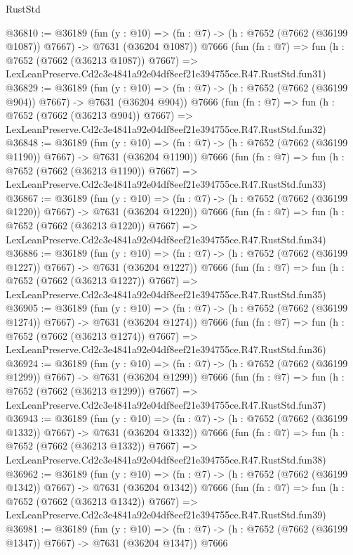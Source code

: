 \begin{lexlean}{RustStd}
\begin{coremodule}
@36810 := @36189
    (fun (y : @10) => (fn : @7) -> (h : @7652 (@7662 (@36199 @1087)) @7667) -> @7631 (@36204 @1087))
    @7666
    (fun (fn : @7) =>
    fun (h : @7652 (@7662 (@36213 @1087)) @7667) =>
    LexLeanPreserve.Cd2c3e4841a92e04df8eef21e394755ce.R47.RustStd.fun31)
@36829 := @36189
    (fun (y : @10) => (fn : @7) -> (h : @7652 (@7662 (@36199 @904)) @7667) -> @7631 (@36204 @904))
    @7666
    (fun (fn : @7) =>
    fun (h : @7652 (@7662 (@36213 @904)) @7667) =>
    LexLeanPreserve.Cd2c3e4841a92e04df8eef21e394755ce.R47.RustStd.fun32)
@36848 := @36189
    (fun (y : @10) => (fn : @7) -> (h : @7652 (@7662 (@36199 @1190)) @7667) -> @7631 (@36204 @1190))
    @7666
    (fun (fn : @7) =>
    fun (h : @7652 (@7662 (@36213 @1190)) @7667) =>
    LexLeanPreserve.Cd2c3e4841a92e04df8eef21e394755ce.R47.RustStd.fun33)
@36867 := @36189
    (fun (y : @10) => (fn : @7) -> (h : @7652 (@7662 (@36199 @1220)) @7667) -> @7631 (@36204 @1220))
    @7666
    (fun (fn : @7) =>
    fun (h : @7652 (@7662 (@36213 @1220)) @7667) =>
    LexLeanPreserve.Cd2c3e4841a92e04df8eef21e394755ce.R47.RustStd.fun34)
@36886 := @36189
    (fun (y : @10) => (fn : @7) -> (h : @7652 (@7662 (@36199 @1227)) @7667) -> @7631 (@36204 @1227))
    @7666
    (fun (fn : @7) =>
    fun (h : @7652 (@7662 (@36213 @1227)) @7667) =>
    LexLeanPreserve.Cd2c3e4841a92e04df8eef21e394755ce.R47.RustStd.fun35)
@36905 := @36189
    (fun (y : @10) => (fn : @7) -> (h : @7652 (@7662 (@36199 @1274)) @7667) -> @7631 (@36204 @1274))
    @7666
    (fun (fn : @7) =>
    fun (h : @7652 (@7662 (@36213 @1274)) @7667) =>
    LexLeanPreserve.Cd2c3e4841a92e04df8eef21e394755ce.R47.RustStd.fun36)
@36924 := @36189
    (fun (y : @10) => (fn : @7) -> (h : @7652 (@7662 (@36199 @1299)) @7667) -> @7631 (@36204 @1299))
    @7666
    (fun (fn : @7) =>
    fun (h : @7652 (@7662 (@36213 @1299)) @7667) =>
    LexLeanPreserve.Cd2c3e4841a92e04df8eef21e394755ce.R47.RustStd.fun37)
@36943 := @36189
    (fun (y : @10) => (fn : @7) -> (h : @7652 (@7662 (@36199 @1332)) @7667) -> @7631 (@36204 @1332))
    @7666
    (fun (fn : @7) =>
    fun (h : @7652 (@7662 (@36213 @1332)) @7667) =>
    LexLeanPreserve.Cd2c3e4841a92e04df8eef21e394755ce.R47.RustStd.fun38)
@36962 := @36189
    (fun (y : @10) => (fn : @7) -> (h : @7652 (@7662 (@36199 @1342)) @7667) -> @7631 (@36204 @1342))
    @7666
    (fun (fn : @7) =>
    fun (h : @7652 (@7662 (@36213 @1342)) @7667) =>
    LexLeanPreserve.Cd2c3e4841a92e04df8eef21e394755ce.R47.RustStd.fun39)
@36981 := @36189
    (fun (y : @10) => (fn : @7) -> (h : @7652 (@7662 (@36199 @1347)) @7667) -> @7631 (@36204 @1347))
    @7666

\end{coremodule}
\end{lexlean}
